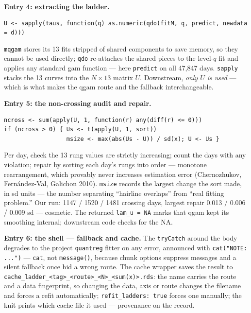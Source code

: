 \documentclass[11pt]{article}
\newcommand{\code}[1]{\texttt{#1}}
\begin{document}
\textbf{Entry 4: extracting the ladder.}
\begin{Verbatim}[fontsize=\small]
U <- sapply(taus, function(q) as.numeric(qdo(fitM, q, predict, newdata = d)))
\end{Verbatim}
\code{mqgam} stores its 13 fits stripped of shared components to save
memory, so they cannot be used directly; \code{qdo} re-attaches the shared
pieces to the level-$q$ fit and applies any standard gam function --- here
\code{predict} on all 47{,}847 days. \code{sapply} stacks the 13 curves
into the $N \times 13$ matrix $U$. Downstream, \emph{only $U$ is used} ---
which is what makes the qgam route and the fallback interchangeable.

\textbf{Entry 5: the non-crossing audit and repair.}
\begin{Verbatim}[fontsize=\small]
ncross <- sum(apply(U, 1, function(r) any(diff(r) <= 0)))
if (ncross > 0) { Us <- t(apply(U, 1, sort))
                  msize <- max(abs(Us - U)) / sd(x); U <- Us }
\end{Verbatim}
Per day, check the 13 rung values are strictly increasing; count the days
with any violation; repair by sorting each day's rungs into order ---
monotone rearrangement, which provably never increases estimation error
(Chernozhukov, Fern\'andez-Val, Galichon 2010). \code{msize} records the
largest change the sort made, in sd units --- the number separating
``hairline overlaps'' from ``real fitting problem.'' Our run: 1147 / 1520 /
1481 crossing days, largest repair 0.013 / 0.006 / 0.009 sd --- cosmetic.
The returned \code{lam\_u = NA} marks that qgam kept its smoothing
internal; downstream code checks for the NA.

\textbf{Entry 6: the shell --- fallback and cache.} The \code{tryCatch}
around the body degrades to the project \code{quantreg} fitter on any
error, announced with \code{cat("NOTE: ...")} --- \code{cat}, not
\code{message()}, because chunk options suppress messages and a silent
fallback once hid a wrong route. The cache wrapper saves the result to
\code{cache\_ladder\_<tag>\_<route>\_<N>\_<sum(x)>.rds}: the name carries
the route and a data fingerprint, so changing the data, axis or route
changes the filename and forces a refit automatically;
\code{refit\_ladders: true} forces one manually; the knit prints which
cache file it used --- provenance on the record.
\end{document}
